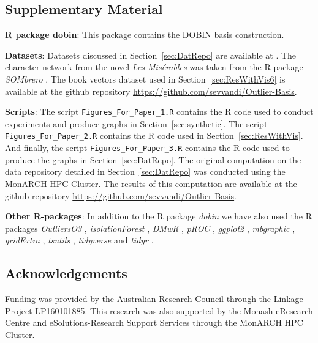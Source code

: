 \documentclass[letter,12pt]{article}
\begin{document}
\subsection*{Supplementary Material}

\textbf{R package dobin}: This package contains the DOBIN basis construction.

\textbf{Datasets}: Datasets discussed in Section~\ref{sec:DatRepo} are available at \cite{datasets}. The character network from the novel \textit{Les Mis\'erables} was taken from the R package \textit{SOMbrero} \citep{sombrero}. The book vectors dataset used in Section~\ref{sec:ResWithVis6} is available at the github repository \url{https://github.com/sevvandi/Outlier-Basis}.

\textbf{Scripts}: The script \texttt{Figures\_For\_Paper\_1.R} contains the R code used to conduct experiments and produce graphs in Section~\ref{sec:synthetic}. The script \texttt{Figures\_For\_Paper\_2.R} contains the R code used in Section~\ref{sec:ResWithVis}. And finally, the script \texttt{Figures\_For\_Paper\_3.R} contains the R code used to produce the graphs in Section~\ref{sec:DatRepo}. The original computation on the data repository detailed in Section~\ref{sec:DatRepo} was conducted using the MonARCH HPC Cluster. The results of this computation are available at the github repository \url{https://github.com/sevvandi/Outlier-Basis}.

\textbf{Other R-packages}: In addition to the R package \textit{dobin} we have also used the R packages \textit{OutliersO3} \citep{O3Rpack}, \textit{isolationForest} \citep{isolationForest}, \textit{DMwR} \citep{DMwR}, \textit{pROC} \citep{pROC}, \textit{ggplot2} \citep{ggplot2}, \textit{mbgraphic} \citep{mbgraphic}, \textit{gridExtra} \citep{gridextra}, \textit{tsutils} \citep{tsutils}, \textit{tidyverse} \citep{tidyverse} and \textit{tidyr} \citep{tidyr}.%


\subsection*{Acknowledgements}

Funding was provided by the Australian Research Council through the Linkage Project LP160101885. This research was also supported by the Monash eResearch Centre and eSolutions-Research Support Services through the MonARCH HPC Cluster.


\end{document}

